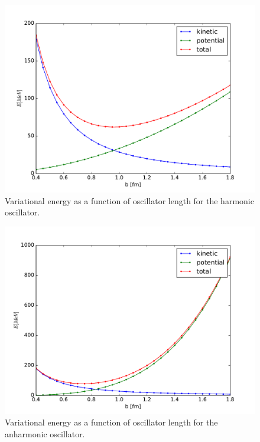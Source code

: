 \documentclass[aps,prl,preprint,groupedaddress]{revtex4-1}
\begin{document}
\begin{figure}
  \includegraphics[width=0.8\linewidth]{figure_1.pdf}
  \caption{Variational energy as a function of oscillator length for the
    harmonic oscillator.}
\end{figure}
\begin{figure}
  \includegraphics[width=0.8\linewidth]{figure_2.pdf}
  \caption{Variational energy as a function of oscillator length for the
    anharmonic oscillator.}
\end{figure}



\end{document}

